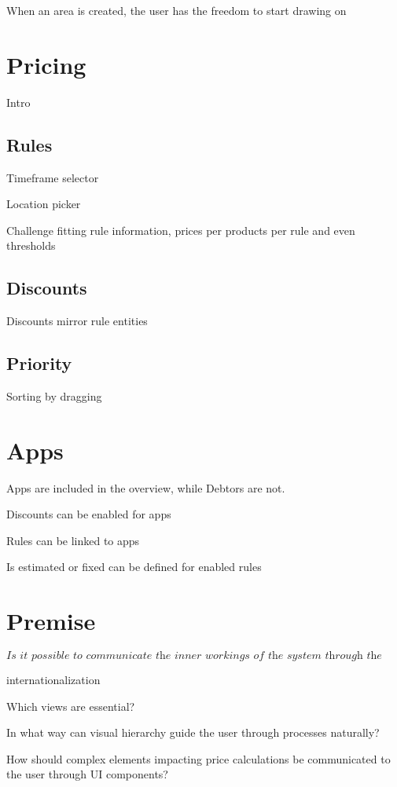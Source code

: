 When an area is created, the user has the freedom to start drawing on

%
\section{Pricing}
Intro

\subsection{Rules}
Timeframe selector

Location picker

Challenge fitting rule information, prices per products per rule and even thresholds

\subsection{Discounts}
Discounts mirror rule entities

\subsection{Priority}
Sorting by dragging

%
\section{Apps}
Apps are included in the overview, while Debtors are not.

Discounts can be enabled for apps

Rules can be linked to apps

Is estimated or fixed can be defined for enabled rules


\section{Premise}
\[\textit{Is it possible to communicate the inner workings of the system through the user interface?}\]

internationalization

Which views are essential?

In what way can visual hierarchy guide the user through processes naturally?

How should complex elements impacting price calculations be communicated to the user through UI components?
